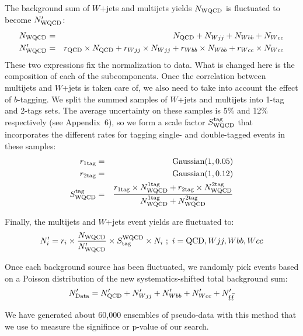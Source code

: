 The background sum of $W$+jets and multijets yields $N_{\rm WQCD}$ is
fluctuated to become $N_{\rm WQCD}^{\prime}$:
\begin{eqnarray*}
N_{\rm WQCD}          &=& N_{\rm QCD} + N_{Wjj} + N_{Wbb} + N_{Wcc} \\
N_{\rm WQCD}^{\prime} &=& r_{\rm QCD}\times N_{\rm QCD}
                        + r_{Wjj}    \times N_{Wjj}
                        + r_{Wbb}    \times N_{Wbb}
                        + r_{Wcc}    \times N_{Wcc}
\end{eqnarray*}
These two expressions fix the normalization to data. What is changed
here is the composition of each of the subcomponents. Once the
correlation between multijets and $W$+jets is taken care of, we also
need to take into account the effect of $b$-tagging. We split the
summed samples of $W$+jets and multijets into 1-tag and 2-tags
sets. The average uncertainty on these samples is 5\% and 12\%
respectively (see Appendix~6), so we form a scale factor $S^{\rm
tag}_{\rm WQCD}$ that incorporates the different rates for tagging
single- and double-tagged events in these samples:
\begin{eqnarray*}
r_{\rm 1tag} &=& {\rm Gaussian}(1,0.05) \\
r_{\rm 2tag} &=& {\rm Gaussian}(1,0.12) \\
S^{\rm tag}_{\rm WQCD}
             &=& \frac{r_{\rm 1tag} \times N^{\rm 1tag}_{\rm WQCD}
                    +  r_{\rm 2tag} \times N^{\rm 2tag}_{\rm WQCD}}
                {N^{\rm 1tag}_{\rm WQCD} + N^{\rm 2tag}_{\rm WQCD}}
\end{eqnarray*}

Finally, the multijets and $W$+jets event yields are fluctuated to:
$$
N_{i}^{\prime} = r_{i} \times \frac{N_{\rm WQCD}}
                                   {N_{\rm WQCD}^{\prime}}
                       \times S_{\rm tag}^{\rm WQCD}
                       \times N_{i} ~;~ i = {\rm QCD}, Wjj, Wbb, Wcc
$$

Once each background source has been fluctuated, we randomly pick
events based on a Poisson distribution of the new systematics-shifted
total background sum:
$$
N_{\rm Data}^{\prime} = N_{\rm QCD}^{\prime}
                      + N_{Wjj}^{\prime}
                      + N_{Wbb}^{\prime}
                      + N_{Wcc}^{\prime}
                      + N_{\mbox{$t\bar{t}$}}^{\prime}
$$

We have generated about 60,000 ensembles of pseudo-data with this
method that we use to measure the signifince or p-value of our search.
